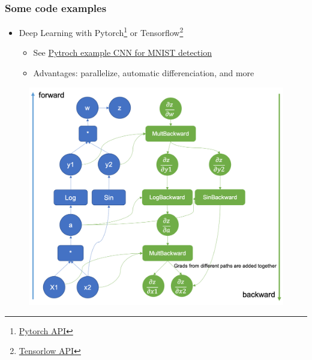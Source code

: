 \begin{frame}\frametitle{Some code examples}
   \begin{itemize}
      \item Deep Learning with Pytorch\footnote{\href{https://pytorch.org/tutorials/beginner/pytorch_with_examples.html}{Pytorch API}} or Tensorflow\footnote{\href{https://www.tensorflow.org/api_docs/python/tf?hl=fr}{Tensorlow API}}
      \begin{itemize}
         \item See \href{https://colab.research.google.com/github/omarsar/pytorch_notebooks/blob/master/pytorch_quick_start.ipynb}{Pytroch example CNN for MNIST detection}
         \item Advantages: parallelize, automatic differenciation, and more
      \end{itemize}
   \end{itemize}

   \begin{figure}[H]
      \includegraphics[scale=.13]{../images/illustrations/model_pytorch_graph.png}
   \end{figure}

\end{frame}




